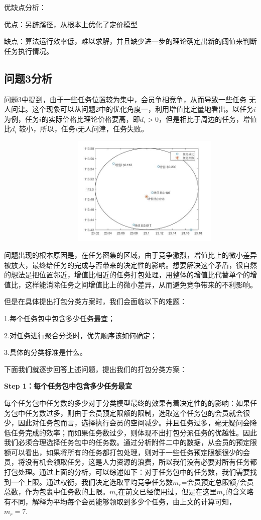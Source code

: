 \documentclass{ctexart}
\begin{document}
优缺点分析：

优点：另辟蹊径，从根本上优化了定价模型

缺点：算法运行效率低，难以求解，并且缺少进一步的理论确定出新的阈值来判断任务执行情况。

\subsection{问题3分析}
问题3中提到，由于一些任务位置较为集中，会员争相竞争，从而导致一些任务
无人问津。这个现象可以从问题2中的优化角度一，利用增值比定量地看出。以任务$i$为例，任务$i$的实际价格比理论价格要高，即$d_{i}>0$，但是相比于周边的任务，增值比$d_{i}$ 较小，所以，任务$i$无人问津，任务失败。



 \ \ \ \ \ \ \  \ \ \  \ \ \ \ \ \ \  \ \ \  \ \includegraphics[width=7cm]{12.5.jpg}

问题出现的根本原因是，在任务密集的区域，由于竞争激烈，增值比上的微小差异被放大，最终给任务的完成与否带来的决定性的影响。想要解决这个矛盾，很自然的想法是把位置邻近，增值比相近的任务打包处理，用整体的增值比代替单个的增值比，这样能消除任务之间增值比上的微小差异，从而避免竞争带来的不利影响。

但是在具体提出打包分类方案时，我们会面临以下的难题：

1.每个任务包中包含多少任务最宜；

2.对任务进行聚合分类时，优先顺序该如何确定；

3.具体的分类标准是什么。

下面我们就逐步回答上述问题，提出我们的打包分类方案：

\textbf{Step 1：每个任务包中包含多少任务最宜}

每个任务包中任务数的多少对于分类模型最终的效果有着决定性的的影响：如果任务包中任务数过多，则由于会员预定限额的限制，选取这个任务包的会员就会很少，因此对任务包而言，选择执行会员的空间减少。并且任务过多，毫无疑问会降低任务完成的效率；而如果任务数过少，则体现不出打包分派任务的优越性。因此我们必须合理选择任务包中的任务数。通过分析附件二中的数据，从会员的预定限额可以看出，如果将所有的任务都打包处理，则对于一些任务预定限额很少的会员，将没有机会领取任务，这是人力资源的浪费，所以我们没有必要对所有任务都打包处理。通过上面的分析，可以综述如下：对于任务包中的任务数，我们需要找到一个上限。通过权衡，我们决定选取平均竞争任务数$m_{r}$=会员预定总限额/会员总数，作为包裹中任务数的上限。$m_{r}$在前文已经使用过，但是在这里$m_{r}$的含义略有不同，解释为平均每个会员能够领取到多少个任务，由上文的计算可知，$m_{r}=7$.
\end{document}
